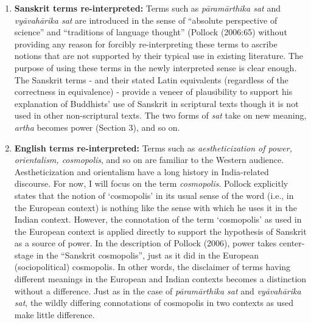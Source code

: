 \begin{enumerate}
\item {\bf Sanskrit terms re-interpreted:} Terms such as {\sl pāramārthika sat}  and {\sl vyāvahārika sat} are introduced in the sense of “absolute perspective of science” and “traditions of language thought” (Pollock (2006:65) without providing any reason for forcibly re-interpreting these terms to ascribe notions that are not supported by their typical use in existing literature. The purpose of using these terms in the newly interpreted sense is clear enough. The Sanskrit terms - and their stated Latin equivalents (regardless of the correctness in equivalence) - provide a veneer of plausibility to support his explanation of Buddhists’ use of Sanskrit in scriptural texts though it is not used in other non-scriptural texts. The two forms of {\sl sat} take on new meaning, {\sl artha} becomes power (Section 3), and so on.


\item {\bf English terms re-interpreted:} Terms such as {\sl aestheticization of power, orientalism, cosmopolis}, and so on are familiar to the Western audience. Aestheticization and orientalism have a long history in India-related discourse. For now, I will focus on the term {\sl cosmopolis}. Pollock explicitly states that the notion of ‘cosmopolis’ in its usual sense of the word (i.e., in the European context) is nothing like the sense with which he uses it in the Indian context. However, the connotation of the term ‘cosmopolis’ as used in the European context is applied directly to support the hypothesis of Sanskrit as a source of power. In the description of Pollock (2006), power takes center-stage in the “Sanskrit cosmopolis”, just as it did in the European (sociopolitical) cosmopolis. In other words, the disclaimer of terms having different meanings in the European and Indian contexts becomes a distinction without a difference. Just as in the case of {\sl pāramārthika sat} and {\sl vyāvahārika sat}, the wildly differing connotations of cosmopolis in two contexts as used make little difference.
\end{enumerate}

